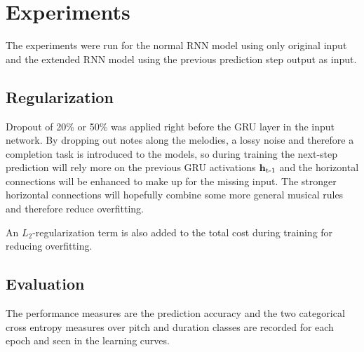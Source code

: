\section{Experiments}
\label{sec:experiments}


The experiments were run for the normal RNN model using only original input and the extended RNN model using the previous prediction step output as input. 



\subsection{Regularization} %
\label{sub:regularization}

Dropout of 20\% or 50\% was applied right before the GRU layer in the input network. By dropping out notes along the melodies, a lossy noise and therefore a completion task is introduced to the models, so during training the next-step prediction will rely more on the previous GRU activations $\bm{\mathrm{h}}_{\text{t-1}}$ and the horizontal connections will be enhanced to make up for the missing input. The stronger horizontal connections will hopefully combine some more general musical rules and therefore reduce overfitting. 

An $L_2$-regularization term is also added to the total cost during training for reducing overfitting.


\subsection{Evaluation}

The performance measures are the prediction accuracy and the two categorical cross entropy measures over pitch and duration classes are recorded for each epoch and seen in the learning curves.

